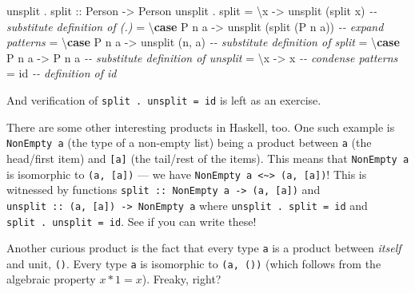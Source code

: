 \documentclass[]{article}
\newenvironment{Shaded}{}{}
\newcommand{\CommentTok}[1]{\textcolor[rgb]{0.38,0.63,0.69}{\textit{#1}}}
\newcommand{\DataTypeTok}[1]{\textcolor[rgb]{0.56,0.13,0.00}{#1}}
\newcommand{\FunctionTok}[1]{\textcolor[rgb]{0.02,0.16,0.49}{#1}}
\newcommand{\KeywordTok}[1]{\textcolor[rgb]{0.00,0.44,0.13}{\textbf{#1}}}
\newcommand{\NormalTok}[1]{#1}
\newcommand{\OperatorTok}[1]{\textcolor[rgb]{0.40,0.40,0.40}{#1}}
\newcommand{\OtherTok}[1]{\textcolor[rgb]{0.00,0.44,0.13}{#1}}
\begin{document}
\begin{Shaded}
\begin{Highlighting}[]
\NormalTok{unsplit }\OperatorTok{.}\OtherTok{ split ::} \DataTypeTok{Person} \OtherTok{{-}\textgreater{}} \DataTypeTok{Person}
\NormalTok{unsplit }\OperatorTok{.}\NormalTok{ split}
    \OtherTok{=}\NormalTok{ \textbackslash{}x          }\OtherTok{{-}\textgreater{}}\NormalTok{ unsplit (split x)        }\CommentTok{{-}{-} substitute definition of (.)}
    \OtherTok{=}\NormalTok{ \textbackslash{}}\KeywordTok{case} \DataTypeTok{P}\NormalTok{ n a }\OtherTok{{-}\textgreater{}}\NormalTok{ unsplit (split (}\DataTypeTok{P}\NormalTok{ n a))  }\CommentTok{{-}{-} expand patterns}
    \OtherTok{=}\NormalTok{ \textbackslash{}}\KeywordTok{case} \DataTypeTok{P}\NormalTok{ n a }\OtherTok{{-}\textgreater{}}\NormalTok{ unsplit (n, a)           }\CommentTok{{-}{-} substitute definition of split}
    \OtherTok{=}\NormalTok{ \textbackslash{}}\KeywordTok{case} \DataTypeTok{P}\NormalTok{ n a }\OtherTok{{-}\textgreater{}} \DataTypeTok{P}\NormalTok{ n a                    }\CommentTok{{-}{-} substitute definition of unsplit}
    \OtherTok{=}\NormalTok{ \textbackslash{}x      }\OtherTok{{-}\textgreater{}}\NormalTok{ x                            }\CommentTok{{-}{-} condense patterns}
    \OtherTok{=} \FunctionTok{id}                                      \CommentTok{{-}{-} definition of id}
\end{Highlighting}
\end{Shaded}

And verification of \texttt{split\ .\ unsplit\ =\ id} is left as an exercise.

There are some other interesting products in Haskell, too. One such example is
\texttt{NonEmpty\ a} (the type of a non-empty list) being a product between
\texttt{a} (the head/first item) and \texttt{{[}a{]}} (the tail/rest of the
items). This means that \texttt{NonEmpty\ a} is isomorphic to
\texttt{(a,\ {[}a{]})} --- we have
\texttt{NonEmpty\ a\ \textless{}\textasciitilde{}\textgreater{}\ (a,\ {[}a{]})}!
This is witnessed by functions
\texttt{split\ ::\ NonEmpty\ a\ -\textgreater{}\ (a,\ {[}a{]})} and
\texttt{unsplit\ ::\ (a,\ {[}a{]})\ -\textgreater{}\ NonEmpty\ a} where
\texttt{unsplit\ .\ split\ =\ id} and \texttt{split\ .\ unsplit\ =\ id}. See if
you can write these!

Another curious product is the fact that every type \texttt{a} is a product
between \emph{itself} and unit, \texttt{()}. Every type \texttt{a} is isomorphic
to \texttt{(a,\ ())} (which follows from the algebraic property \(x * 1 = x\)).
Freaky, right?
\end{document}
